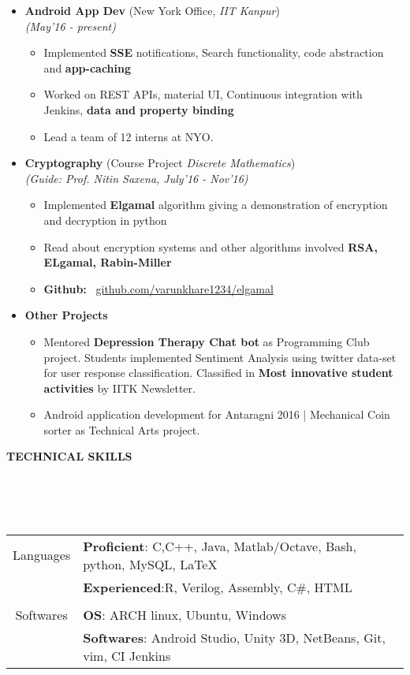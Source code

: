 \documentclass[a4paper,10pt]{article}
\newcommand{\isep}{-2 pt}
\newcommand{\lsep}{-0.5cm}
\newcommand{\resheading}[1]{{\small \colorbox{mygrey}{\begin{minipage}{0.975\textwidth}{\textbf{#1 \vphantom{p\^{E}}}}\end{minipage}}}}
\begin{document}
\begin{itemize}
\item \textbf{Android App Dev} (New York Office, \textit{IIT Kanpur}) \\
\emph{(May'16 - present)} \\[-0.6cm]
	\begin{itemize}\itemsep \isep
	\item Implemented \textbf{SSE} notifications, Search functionality, code abstraction and \textbf{app-caching}
	\item Worked on REST APIs, material UI, Continuous integration with Jenkins, \textbf{data and property binding} 
	\item Lead a team of 12 interns at NYO.
	\end{itemize}
\item \textbf{Cryptography} (Course Project \textit{Discrete Mathematics}) \\
\emph{(Guide: Prof. Nitin Saxena, July'16 - Nov'16)} \\[-0.6cm]
	\begin{itemize}\itemsep \isep
	\item Implemented \textbf{Elgamal} algorithm giving a demonstration of encryption and decryption in python
	\item Read about encryption systems and other algorithms involved \textbf{RSA, ELgamal, Rabin-Miller}
	\item \textbf{Github:} \ \href{https://github.com/varunkhare1234/elgamal}{github.com/varunkhare1234/elgamal}
	\end{itemize}
\item\textbf{Other Projects}
\begin{itemize}
\item Mentored \textbf{Depression Therapy Chat bot} as Programming Club project. Students implemented Sentiment Analysis using twitter data-set for user response classification. Classified in \textbf{Most innovative student activities} by IITK Newsletter.
\item Android application development for Antaragni 2016 | Mechanical Coin sorter as Technical Arts project.
\end{itemize}
\end{itemize}	
\resheading{\textbf{TECHNICAL SKILLS} }\\[\lsep]
\\ \\
\indent \begin{tabular}{c @{\hskip 0.3in}| @{\hskip 0.1in}l}
Languages & \textbf{Proficient}: C,C++, Java, Matlab/Octave, Bash, python, MySQL, \LaTeX \\
& \textbf{Experienced}:R, Verilog, Assembly, C\#, HTML\\
\\
Softwares & \textbf{OS}: ARCH linux, Ubuntu, Windows\\
& \textbf{Softwares}: Android Studio, Unity 3D, NetBeans, Git, vim, CI Jenkins
\end{tabular}
\end{document}
